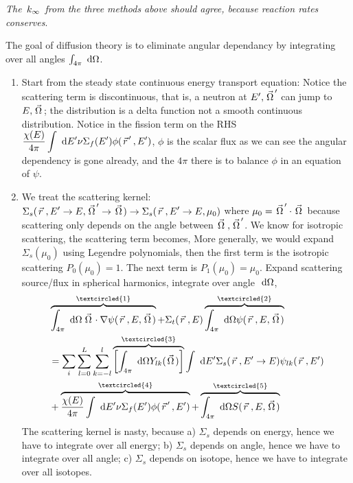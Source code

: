\documentclass{school-22.211-notes}
\begin{document}
\textit{The $\left. k_{\infty} \right.$ from the three methods above should agree, because reaction rates conserves}.


\clearpage
{}
The goal of diffusion theory is to eliminate angular dependancy by integrating over all angles $\int_{4\pi} \mbox{ }\mathrm{d} \Omega$.
\begin{enumerate}
\item Start from the steady state continuous energy transport equation: 
Notice the scattering term is discontinuous, that is, a neutron at $E', \left.\vec{\Omega}\right.'$ can jump to $E, \left.\vec{\Omega}\right.$; the distribution is a delta function not a smooth continuous distribution. Notice in the fission term on the RHS $\displaystyle \frac{\chi(E)}{4 \pi} \int \mbox{ }\mathrm{d} E' \nu \Sigma_f (E') \phi(\left.\vec{r}\right.', E')$,  $\phi$ is the scalar flux as we can see the angular dependency is gone already, and the $4 \pi$ there is to balance $\phi$ in an equation of $\psi$. 


\item We treat the scattering kernel: $\displaystyle \Sigma_s(\left.\vec{r}\right., E'\to E, \left.\vec{\Omega}\right.' \to \left.\vec{\Omega}\right.) \to \Sigma_s (\left.\vec{r}\right., E'\to E, \mu_0)$ where $\mu_0 = \left.\vec{\Omega}\right.' \cdot \left.\vec{\Omega}\right.$ because scattering only depends on the angle between $\left.\vec{\Omega}\right., \left.\vec{\Omega}\right.'$. We know for isotropic scattering, the scattering term becomes, 
More generally, we would expand $\Sigma_s (\mu_0)$ using Legendre polynomials, then the first term is the isotropic scattering $P_0(\mu_0) = 1$. The next term is $P_1 (\mu_0) = \mu_0$. Expand scattering source/flux in spherical harmonics, integrate over angle $\mbox{ }\mathrm{d} \Omega$,
\begin{align}
 &\overbrace{\int_{4\pi} \dOmega \vecOmega \cdot \gradient \psi(\vecr, E, \vecOmega)}^{\textcircled{1}} 
+ \Sigma_t (\vecr, E) \overbrace{\int_{4\pi} \dOmega \psi(\vecr, E, \vecOmega)}^{\textcircled{2}} \notag \\
&= \Sum_i \Sum_{l=0}^L \Sum_{k=-l}^l \overbrace{\left[\int_{4\pi} \dOmega Y_{lk} (\vecOmega) \right]}^{\textcircled{3}} \int \dE' \Sigma_s(\vecr, E'\to E) \psi_{lk}(\vecr, E') \notag \\
&+ \overbrace{ \frac{\chi(E)}{4 \pi} \int \dE' \nu \Sigma_f (E') \phi(\vecr', E')  }^{\textcircled{4}} + \overbrace{\int_{4\pi} \dOmega S(\vecr, E, \vecOmega)}^{\textcircled{5}} 
\end{align}
The scattering kernel is nasty, because a) $\Sigma_s$ depends on energy, hence we have to integrate over all energy; b) $\Sigma_s$ depends on angle, hence we have to integrate over all angle; c) $\Sigma_s$ depends on isotope, hence we have to integrate over all isotopes. 


\end{enumerate}
\end{document}
